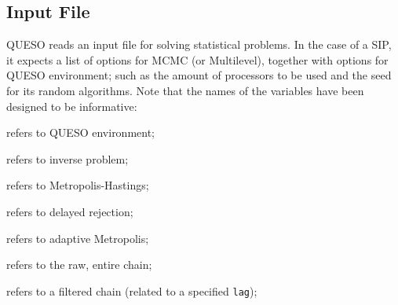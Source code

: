 



\newpage



\newpage




 


\subsection{Input File}\label{sec:sip-input-file}


QUESO reads an input file for solving statistical problems. In the case of a SIP, it expects a list of options for MCMC (or Multilevel),
together with options for QUESO environment; such as the amount of processors to be used and the seed for its random algorithms.
Note that the names of the variables have been designed to be informative:
\begin{description}\vspace{-8pt}
\item[ \texttt{env}:] refers to QUESO environment; \vspace{-8pt}
\item[ \texttt{ip}:] refers to inverse problem;\vspace{-8pt}
\item[ \texttt{mh}:] refers to Metropolis-Hastings;\vspace{-8pt}
\item[ \texttt{dr}:] refers to delayed rejection;\vspace{-8pt}
\item[ \texttt{am}:] refers to adaptive Metropolis;\vspace{-8pt}
\item[ \texttt{rawChain}:] refers to the raw, entire chain; \vspace{-8pt}
\item[ \texttt{filteredChain}:] refers to a filtered chain (related to a specified \texttt{lag});\vspace{-8pt}
\end{description}


